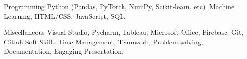 

\begin{cvskills}

  \cvskill
    {Programming} %
    {Python (Pandas, PyTorch, NumPy, Scikit‑learn. etc), Machine Learning, HTML/CSS, JavaScript, SQL.} %

  \cvskill
    {Miscellaneous} %
    {Visual Studio, Pycharm, Tableau, Microsoft Office, Firebase, Git, Gitlab} %
  \cvskill
    {Soft Skills} %
    {Time Management, Teamwork, Problem-solving, Documentation, Engaging Presentation.} %

\end{cvskills}
